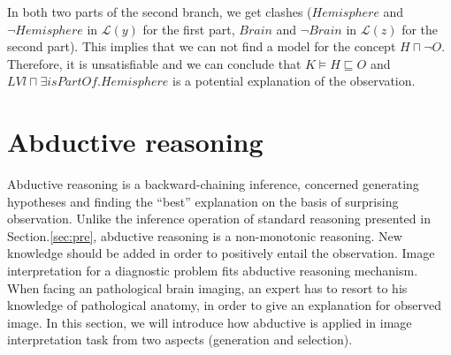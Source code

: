 \documentclass{article}
\begin{document}
\begin{center}
\end{center}

In both two parts of the second branch, we get clashes ($Hemisphere$ and $\neg Hemisphere$ in $\mathcal{L}(y)$ for the first part, $Brain$ and $\neg Brain$ in $\mathcal{L}(z)$ for the second part).
This implies that we can not find a model for the concept $H\sqcap \neg O$. Therefore, it is unsatisfiable and we can conclude that $K\vDash H\sqsubseteq O$ and $LVl\sqcap \exists isPartOf.Hemisphere$ is a potential
explanation of the observation.
\section{Abductive reasoning}\label{sec:abd}

Abductive reasoning is a backward-chaining inference, concerned generating hypotheses and finding the ``best'' explanation on the basis of surprising observation.
Unlike the inference operation of standard reasoning presented in Section.\ref{sec:pre}, abductive reasoning is a non-monotonic reasoning.
New knowledge should be added in order to positively entail the observation.
Image interpretation for a diagnostic problem fits abductive reasoning  mechanism.
When facing an pathological brain imaging, an expert has to resort to his knowledge of pathological anatomy, in order to give  an explanation for observed image. 
In this section, we will introduce how abductive is applied in image interpretation task from two aspects (generation and selection).

\end{document}
